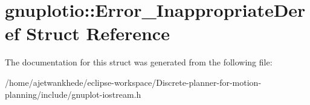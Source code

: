 \hypertarget{structgnuplotio_1_1Error__InappropriateDeref}{}\section{gnuplotio\+:\+:Error\+\_\+\+Inappropriate\+Deref Struct Reference}
\label{structgnuplotio_1_1Error__InappropriateDeref}


The documentation for this struct was generated from the following file\+:\begin{DoxyCompactItemize}
\item 
/home/ajetwankhede/eclipse-\/workspace/\+Discrete-\/planner-\/for-\/motion-\/planning/include/gnuplot-\/iostream.\+h\end{DoxyCompactItemize}

